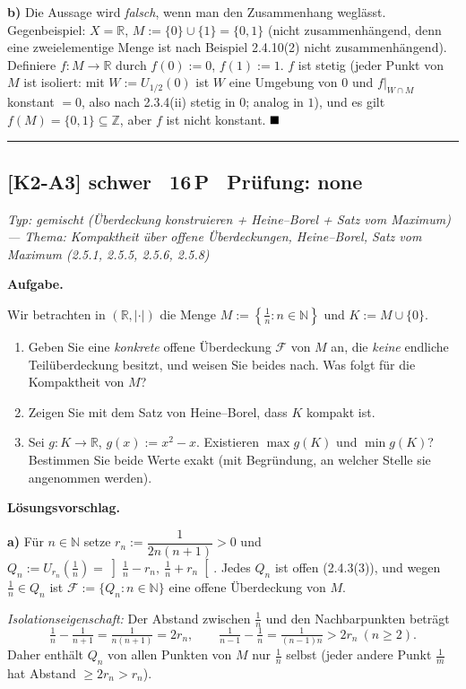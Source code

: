 \documentclass[a4paper,11pt]{article}
\providecommand{\qed}{\hfill\ensuremath{\blacksquare}}
\begin{document}
\textbf{b)} Die Aussage wird \emph{falsch}, wenn man den Zusammenhang weglässt. Gegenbeispiel: $X=\mathbb{R}$, $M:=\{0\}\cup\{1\}=\{0,1\}$ (nicht zusammenhängend, denn eine zweielementige Menge ist nach Beispiel 2.4.10(2) nicht zusammenhängend). Definiere $f:M\to\mathbb{R}$ durch $f(0):=0$, $f(1):=1$. $f$ ist stetig (jeder Punkt von $M$ ist isoliert: mit $W:=U_{1/2}(0)$ ist $W$ eine Umgebung von $0$ und $f|_{W\cap M}$ konstant $=0$, also nach 2.3.4(ii) stetig in $0$; analog in $1$), und es gilt $f(M)=\{0,1\}\subseteq\mathbb{Z}$, aber $f$ ist nicht konstant. $\qed$\par\bigskip\hrule\bigskip
\subsection*{[K2-A3] \normalfont schwer \textbullet\ 16\,P \textbullet\ Pr\"ufung: none}
\textit{Typ: gemischt (Überdeckung konstruieren + Heine–Borel + Satz vom Maximum)  ---  Thema: Kompaktheit über offene Überdeckungen, Heine–Borel, Satz vom Maximum (2.5.1, 2.5.5, 2.5.6, 2.5.8)}\par\smallskip
\textbf{Aufgabe.}\par
Wir betrachten in $(\mathbb{R},|\cdot|)$ die Menge $M:=\left\{\tfrac1n : n\in\mathbb{N}\right\}$ und $K:=M\cup\{0\}$.

\begin{enumerate}[label=\alph*)]
  \item Geben Sie eine \emph{konkrete} offene Überdeckung $\mathcal F$ von $M$ an, die \emph{keine} endliche Teilüberdeckung besitzt, und weisen Sie beides nach. Was folgt für die Kompaktheit von $M$?
  \item Zeigen Sie mit dem Satz von Heine–Borel, dass $K$ kompakt ist.
  \item Sei $g:K\to\mathbb{R}$, $g(x):=x^2-x$. Existieren $\max g(K)$ und $\min g(K)$? Bestimmen Sie beide Werte exakt (mit Begründung, an welcher Stelle sie angenommen werden).
\end{enumerate}\par\smallskip
\textbf{L\"osungsvorschlag.}\par
\textbf{a)} Für $n\in\mathbb{N}$ setze $r_n:=\dfrac{1}{2n(n+1)}>0$ und $Q_n:=U_{r_n}\!\left(\tfrac1n\right)=\left]\tfrac1n-r_n,\ \tfrac1n+r_n\right[$. Jedes $Q_n$ ist offen (2.4.3(3)), und wegen $\tfrac1n\in Q_n$ ist $\mathcal F:=\{Q_n : n\in\mathbb{N}\}$ eine offene Überdeckung von $M$.

\emph{Isolationseigenschaft:} Der Abstand zwischen $\tfrac1n$ und den Nachbarpunkten beträgt
\[\tfrac1n-\tfrac1{n+1}=\tfrac{1}{n(n+1)}=2r_n,\qquad \tfrac1{n-1}-\tfrac1n=\tfrac{1}{(n-1)n}>2r_n\ (n\ge2).\]
Daher enthält $Q_n$ von allen Punkten von $M$ nur $\tfrac1n$ selbst (jeder andere Punkt $\tfrac1m$ hat Abstand $\ge 2r_n> r_n$).
\end{document}
